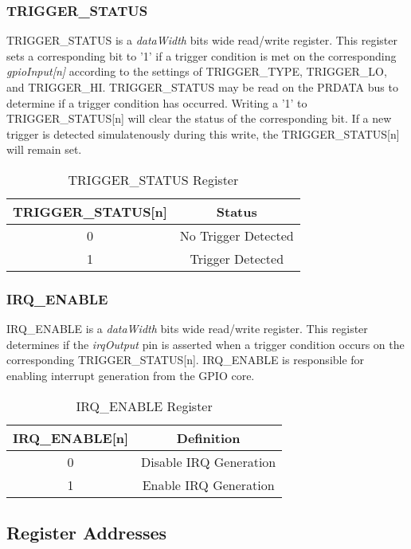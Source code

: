 \subsubsection{TRIGGER\_STATUS}
TRIGGER\_STATUS is a \textit{dataWidth} bits wide read/write register. This register sets a corresponding bit to '1' if a trigger condition is met on
the corresponding \textit{gpioInput[n]} according to the settings of TRIGGER\_TYPE, TRIGGER\_LO, and TRIGGER\_HI.
\newline
\newline
TRIGGER\_STATUS may be read on the PRDATA bus to determine if a trigger condition has occurred. Writing a '1' to TRIGGER\_STATUS[n] will clear the 
status of the corresponding bit. If a new trigger is detected simulatenously during this write, the TRIGGER\_STATUS[n] will remain set.
\begin{table}[h]
  \centering
  \begin{tabular}{|c|c|}
      \hline
      \textbf{TRIGGER\_STATUS[n]} & \textbf{Status} \\ \hline
      0 & No Trigger Detected \\ \hline
      1 & Trigger Detected\\ \hline
  \end{tabular}
  \caption{TRIGGER\_STATUS Register}
\end{table}

\newpage
\subsubsection{IRQ\_ENABLE}
IRQ\_ENABLE is a \textit{dataWidth} bits wide read/write register. This register determines if the \textit{irqOutput} pin is asserted when a trigger condition
occurs on the corresponding TRIGGER\_STATUS[n]. IRQ\_ENABLE is responsible for enabling interrupt generation from the GPIO core.
\begin{table}[h]
  \centering
  \begin{tabular}{|c|c|}
      \hline
      \textbf{IRQ\_ENABLE[n]} & \textbf{Definition} \\ \hline
      0 & Disable IRQ Generation\\ \hline
      1 & Enable IRQ Generation \\ \hline
  \end{tabular}
  \caption{IRQ\_ENABLE Register}
\end{table}

\newpage

\subsection{Register Addresses}
